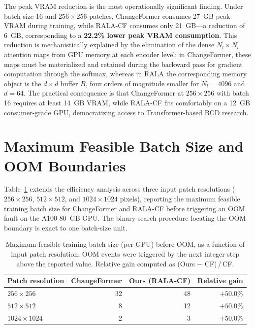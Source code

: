 The peak \ac{VRAM} reduction is the most operationally significant finding. Under
batch size 16 and $256 \times 256$ patches, ChangeFormer consumes 27~GB peak
\ac{VRAM} during training, while \ac{RALA-CF} consumes only 21~GB---a
reduction of 6~GB, corresponding to a \textbf{22.2\% lower peak \ac{VRAM}
consumption}. This reduction is mechanistically explained by the elimination of
the dense $N_l \times N_l$ attention maps from \ac{GPU} memory at each encoder
level: in ChangeFormer, these maps must be materialized and retained during the
backward pass for gradient computation through the softmax, whereas in \ac{RALA}
the corresponding memory object is the $d \times d$ buffer $B$, four orders of
magnitude smaller for $N_l = 4096$ and $d = 64$. The practical consequence is that
ChangeFormer at $256 \times 256$ with batch 16 requires at least 14~GB \ac{VRAM},
while \ac{RALA-CF} fits comfortably on a 12~GB consumer-grade \ac{GPU},
democratizing access to Transformer-based \ac{BCD} research.


\section{Maximum Feasible Batch Size and OOM Boundaries}
\label{sec:exp-batch}

Table~\ref{tab:batch_oom} extends the efficiency analysis across three input patch
resolutions ($256 \times 256$, $512 \times 512$, and $1024 \times 1024$ pixels),
reporting the maximum feasible training batch size for ChangeFormer and \ac{RALA-CF}
before triggering an \ac{OOM} fault on the A100 80~GB \ac{GPU}. The binary-search
procedure locating the \ac{OOM} boundary is exact to one batch-size unit.

\begin{table}[htbp]
\centering
\caption{Maximum feasible training batch size (per \ac{GPU}) before \ac{OOM},
as a function of input patch resolution. \ac{OOM} events were triggered by the
next integer step above the reported value. Relative gain computed as
(Ours $-$ CF)\,/\,CF.}
\label{tab:batch_oom}
\renewcommand{\arraystretch}{1.15}
{\small
\begin{tabular}{|l|r|r|r|}
\hline
\textbf{Patch resolution}
    & \textbf{ChangeFormer}
    & \textbf{Ours (RALA-CF)}
    & \textbf{Relative gain} \\
\hline\hline
$256 \times 256$   & 32 & 48 & $+50.0\%$ \\
\hline
$512 \times 512$   &  8 & 12 & $+50.0\%$ \\
\hline
$1024 \times 1024$ &  2 &  3 & $+50.0\%$ \\
\hline
\end{tabular}
}
\end{table}

